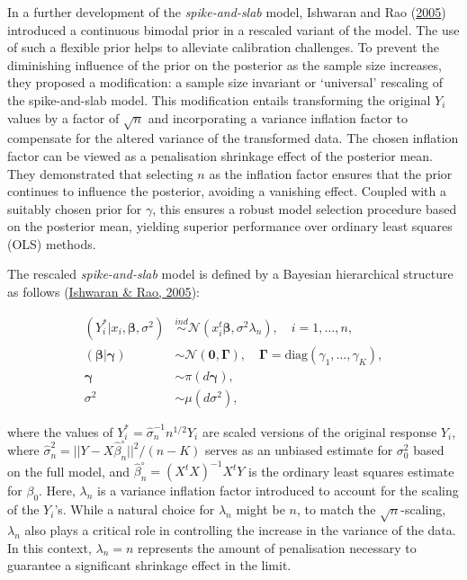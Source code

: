 \documentclass[
  11pt,
]{article}
\begin{document}
In a further development of the \emph{spike-and-slab} model, Ishwaran
and Rao (\protect\hyperlink{ref-Ishwaran2005}{2005}) introduced a
continuous bimodal prior in a rescaled variant of the model. The use of
such a flexible prior helps to alleviate calibration challenges. To
prevent the diminishing influence of the prior on the posterior as the
sample size increases, they proposed a modification: a sample size
invariant or `universal' rescaling of the spike-and-slab model. This
modification entails transforming the original \(Y_i\) values by a
factor of \(\sqrt{n}\) and incorporating a variance inflation factor to
compensate for the altered variance of the transformed data. The chosen
inflation factor can be viewed as a penalisation shrinkage effect of the
posterior mean. They demonstrated that selecting \(n\) as the inflation
factor ensures that the prior continues to influence the posterior,
avoiding a vanishing effect. Coupled with a suitably chosen prior for
\(\gamma\), this ensures a robust model selection procedure based on the
posterior mean, yielding superior performance over ordinary least
squares (OLS) methods.

The rescaled \emph{spike-and-slab} model is defined by a Bayesian
hierarchical structure as follows
(\protect\hyperlink{ref-Ishwaran2005}{Ishwaran \& Rao, 2005}):

\begin{align*}
    (Y_i^* | x_i, \boldsymbol{\beta}, \sigma^2) &\stackrel{ind}\sim \mathcal{N}(x_i^t \boldsymbol{\beta}, \sigma^2 \lambda_n), \quad i = 1, \ldots, n, \\
    (\boldsymbol{\beta} | \boldsymbol{\gamma}) &\sim \mathcal{N}(\mathbf{0}, \boldsymbol{\Gamma}), \quad \boldsymbol{\Gamma} = \text{diag}(\gamma_1, \ldots, \gamma_K), \\
    \boldsymbol{\gamma} &\sim \pi(d\boldsymbol{\gamma}), \\
    \sigma^2 &\sim \mu(d\sigma^2),
\end{align*}

where the values of \(Y_i^* = \hat{\sigma}_n^{-1} n^{1/2} Y_i\) are
scaled versions of the original response \(Y_i\), where
\(\hat{\sigma}_n^2 = ||Y-X\hat{\beta}_n^{\circ}||^2 / (n-K)\) serves as
an unbiased estimate for \(\sigma_0^2\) based on the full model, and
\(\hat{\beta}_n^{\circ} = (X^tX)^{-1} X^tY\) is the ordinary least
squares estimate for \(\beta_0\). Here, \(\lambda_n\) is a variance
inflation factor introduced to account for the scaling of the \(Y_i\)'s.
While a natural choice for \(\lambda_n\) might be \(n\), to match the
\(\sqrt{n}\)-scaling, \(\lambda_n\) also plays a critical role in
controlling the increase in the variance of the data. In this context,
\(\lambda_n = n\) represents the amount of penalisation necessary to
guarantee a significant shrinkage effect in the limit.
\end{document}

